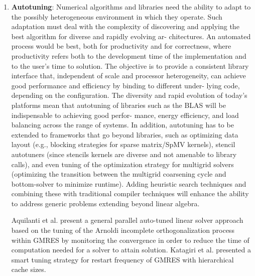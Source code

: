 \begin{enumerate}
	\item \textbf{Autotuning}: Numerical algorithms and libraries need the ability to adapt to the possibly heterogeneous environment in which they operate. Such adaptation must deal with the complexity of discovering and applying the best algorithm for diverse and rapidly evolving ar- chitectures. An automated process would be best, both for productivity and for correctness, where productivity refers both to the development time of the implementation and to the user’s time to solution. The objective is to provide a consistent library interface that, independent of scale and processor heterogeneity, can achieve good performance and efficiency by binding to different under- lying code, depending on the configuration. The diversity and rapid evolution of today’s platforms mean that autotuning of libraries such as the BLAS will be indispensable to achieving good perfor- mance, energy efficiency, and load balancing across the range of systems. In addition, autotuning has to be extended to frameworks that go beyond libraries, such as optimizing data layout (e.g., blocking strategies for sparse matrix/SpMV kernels), stencil autotuners (since stencils kernels are diverse and not amenable to library calls), and even tuning of the optimization strategy for multigrid solvers (optimizing the transition between the multigrid coarsening cycle and bottom-solver to minimize runtime). Adding heuristic search techniques and combining these with traditional compiler techniques will enhance the ability to address generic problems extending beyond linear algebra.
	
	Aquilanti et al. \cite{aquilanti2011parallel} present a general parallel auto-tuned linear solver approach based on the tuning of the Arnoldi incomplete orthogonalization process within GMRES by monitoring the convergence in order to reduce the time of computation needed for a solver to attain solution. Katagiri et al. \cite{katagiri2012smart} presented a smart tuning strategy for restart frequency of GMRES with hierarchical cache sizes.
	

\end{enumerate}
